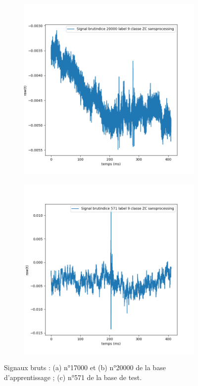 \begin{figure}[!h]
\begin{subfigure}[b]{0.3\textwidth}
    \includegraphics[width=\textwidth]{./images/indice20000Spectro1Dlabel9classeZCsansprocessingsanszoom.png}
	\caption{}
  	\end{subfigure}
  	\begin{subfigure}[b]{0.3\textwidth}
    \includegraphics[width=\textwidth]{./images/indice571Spectro1Dlabel9classeZCsansprocessingsanszoom.png}
    	\caption{}
	\end{subfigure}
\caption{Signaux bruts : (a) n°17000 et (b) n°20000 de la base d'apprentissage ; (c) n°571 de la base de test.%
\label{fig:signauxbruts}}
\end{figure}

